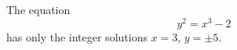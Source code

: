 \begin{proposition}
    The equation
\[
    y^2=x^3-2
\]
    has only the integer solutions $x=3$, $y=\pm5$.
\end{proposition}
